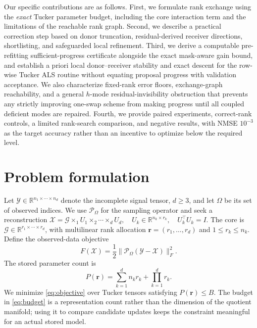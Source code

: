 \documentclass[review,10pt]{elsarticle}
\newcommand{\cX}{\mathcal X}
\newcommand{\cY}{\mathcal Y}
\newcommand{\cG}{\mathcal G}
\newcommand{\Om}{\Omega}
\newcommand{\R}{\mathbb R}
\begin{document}
Our specific contributions are as follows. First, we formulate rank exchange using the \emph{exact} Tucker parameter budget, including the core interaction term and the limitations of the reachable rank graph. Second, we describe a practical correction step based on donor truncation, residual-derived receiver directions, shortlisting, and safeguarded local refinement. Third, we derive a computable pre-refitting sufficient-progress certificate alongside the exact mask-aware gain bound, and establish a priori local donor--receiver stability and exact descent for the row-wise Tucker ALS routine without equating proposal progress with validation acceptance. We also characterize fixed-rank error floors, exchange-graph reachability, and a general $h$-mode residual-invisibility obstruction that prevents any strictly improving one-swap scheme from making progress until all coupled deficient modes are repaired. Fourth, we provide paired experiments, correct-rank controls, a limited rank-search comparison, and negative results, with NMSE $10^{-3}$ as the target accuracy rather than an incentive to optimize below the required level.

\section{Problem formulation}\label{sec:problem}
Let $\cY\in\R^{n_1\times\cdots\times n_d}$ denote the incomplete signal tensor, $d\geq 3$, and let $\Om$ be its set of observed indices. We use $\mathcal P_{\Om}$ for the sampling operator and seek a reconstruction
 \(\cX=\cG\times_1 U_1\times_2\cdots\times_d U_d, \quad U_k\in\R^{n_k\times r_k},\quad U_k^\top U_k=I.\) 
The core is $\cG\in\R^{r_1\times\cdots\times r_d}$, with multilinear rank allocation $\boldsymbol r=(r_1,\dots,r_d)$ and $1\leq r_k\leq n_k$. Define the observed-data objective
\begin{equation}\label{eq:objective}
F(\cX)=\frac12\|\mathcal P_{\Om}(\cY-\cX)\|_F^2.
\end{equation}
The stored parameter count is
\begin{equation}\label{eq:budget}
P(\boldsymbol r)=\sum_{k=1}^{d}n_kr_k+\prod_{k=1}^{d}r_k.
\end{equation}
We minimize \eqref{eq:objective} over Tucker tensors satisfying $P(\boldsymbol r)\leq B$. The budget in \eqref{eq:budget} is a representation count rather than the dimension of the quotient manifold; using it to compare candidate updates keeps the constraint meaningful for an actual stored model.
\end{document}
